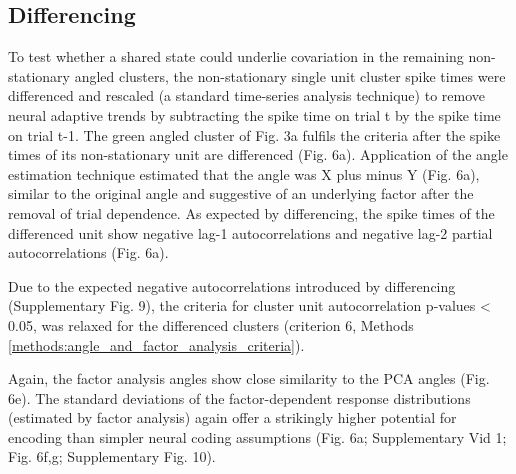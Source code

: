 \documentclass{article}
\begin{document}
\subsection*{Differencing}

To test whether a shared state could underlie covariation in the remaining non-stationary angled clusters, the non-stationary single unit cluster spike times were differenced and rescaled (a standard time-series analysis technique) to remove neural adaptive trends by subtracting the spike time on trial t by the spike time on trial t-1.
The green angled cluster of Fig. 3a fulfils the criteria after the spike times of its non-stationary unit are differenced (Fig. 6a). Application of the angle estimation technique estimated that the angle was X plus minus Y (Fig. 6a), similar to the original angle and suggestive of an underlying factor after the removal of trial dependence. As expected by differencing, the spike times of the differenced unit show negative lag-1 autocorrelations and negative lag-2 partial autocorrelations (Fig. 6a). 

 
Due to the expected negative autocorrelations introduced by differencing (Supplementary Fig. 9), the criteria for cluster unit autocorrelation p-values < 0.05, was relaxed for the differenced clusters (criterion 6, Methods \ref{methods:angle_and_factor_analysis_criteria}).

Again, the factor analysis angles show close similarity to the PCA angles (Fig. 6e).
The standard deviations of the factor-dependent response distributions (estimated by factor analysis) again offer a strikingly higher potential for encoding than simpler neural coding assumptions (Fig. 6a; Supplementary Vid 1; Fig. 6f,g; Supplementary Fig. 10).

\end{document}
